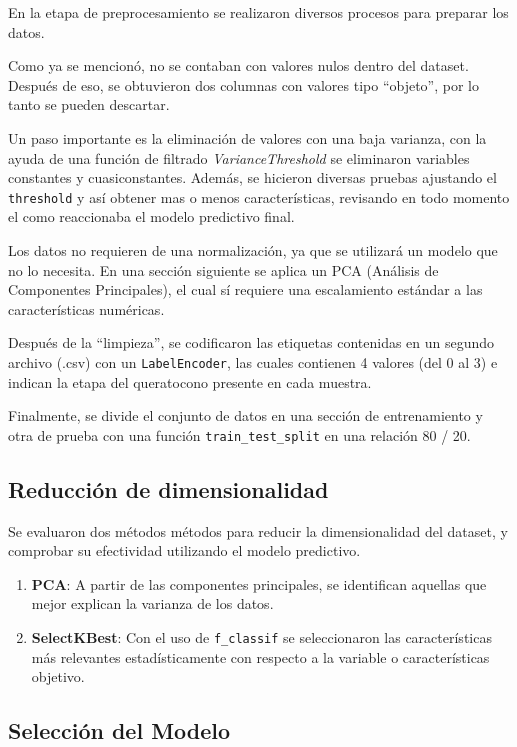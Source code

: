 \documentclass{replab}
\begin{document}
En la etapa de preprocesamiento se realizaron diversos procesos para preparar los datos.

Como ya se mencionó, no se contaban con valores nulos dentro del dataset. Después de eso, se obtuvieron dos columnas con valores tipo ``objeto'', por lo tanto se pueden descartar.

Un paso importante es la eliminación de valores con una baja varianza, con la ayuda de una función de filtrado \textit{VarianceThreshold} se eliminaron variables constantes y cuasiconstantes. Además, se hicieron diversas pruebas ajustando el \texttt{threshold} y así obtener mas o menos características, revisando en todo momento el como reaccionaba el modelo predictivo final.

Los datos no requieren de una normalización, ya que se utilizará un modelo que no lo necesita. En una sección siguiente se aplica un PCA (Análisis de Componentes Principales), el cual sí requiere una escalamiento estándar a las características numéricas.

Después de la ``limpieza'', se codificaron las etiquetas contenidas en un segundo archivo (.csv) con un \texttt{LabelEncoder}, las cuales contienen 4 valores (del 0 al 3) e indican la etapa del queratocono presente en cada muestra.

Finalmente, se divide el conjunto de datos en una sección de entrenamiento y otra de prueba con una función \texttt{train\_test\_split} en una relación 80 / 20.

\subsection{Reducción de dimensionalidad}

Se evaluaron dos métodos métodos para reducir la dimensionalidad del dataset, y comprobar su efectividad utilizando el modelo predictivo.

\begin{enumerate}[itemsep=-2pt]
    \item  \textbf{PCA}: A partir de las componentes principales, se identifican aquellas que mejor explican la varianza de los datos.
    \item  \textbf{SelectKBest}: Con el uso de \texttt{f\_classif} se seleccionaron las características más relevantes estadísticamente con respecto a la variable o características objetivo.
\end{enumerate}

\subsection{Selección del Modelo}
\end{document}
